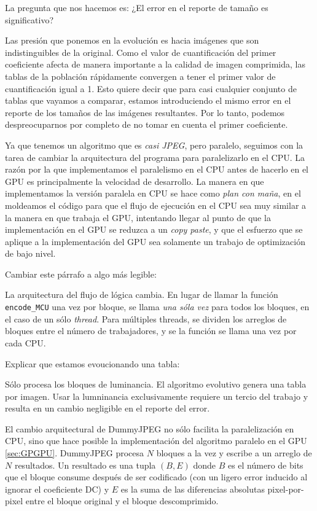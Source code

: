 La pregunta que nos hacemos es: ¿El error en el reporte de tamaño es significativo?

Las presión que ponemos en la evolución es hacia imágenes que son
indistinguibles de la original. Como el valor de cuantificación del primer
coeficiente afecta de manera importante a la calidad de imagen comprimida, las
tablas de la población rápidamente convergen a tener el primer valor de
cuantificación igual a 1. Esto quiere decir que para casi cualquier conjunto de
tablas que vayamos a comparar, estamos introduciendo el mismo error en el
reporte de los tamaños de las imágenes resultantes. Por lo tanto, podemos
despreocuparnos por completo de no tomar en cuenta el primer coeficiente.

Ya que tenemos un algoritmo que es \emph{casi JPEG}, pero paralelo, seguimos
con la tarea de cambiar la arquitectura del programa para paralelizarlo en el
CPU. La razón por la que implementamos el paralelismo en el CPU antes de
hacerlo en el GPU es principalmente la velocidad de desarrollo. La manera en
que implementamos la versión paralela en CPU se hace como \emph{plan con maña},
en el moldeamos el código para que el flujo de ejecución en el CPU sea muy
similar a la manera en que trabaja el GPU, intentando llegar al punto de que la
implementación en el GPU se reduzca a un \emph{copy paste}, y que el esfuerzo
que se aplique a la implementación del GPU sea solamente un trabajo de
optimización de bajo nivel.

Cambiar este párrafo a algo más legible:

    La arquitectura del flujo de lógica cambia. En lugar de llamar la
        función \verb+encode_MCU+ una vez por bloque, se llama \emph{una sóla
    vez} para todos los bloques, en el caso de un sólo \emph{thread}. Para
múltiples threads, se dividen los arreglos de bloques entre el número de
trabajadores, y se la función se llama una vez por cada CPU.

Explicar que estamos evoucionando una tabla:

    Sólo procesa los bloques de luminancia. El algoritmo evolutivo genera
        una tabla por imagen. Usar la lumninancia exclusivamente requiere un
    tercio del trabajo y resulta en un cambio negligible en el reporte del
error.

El cambio arquitectural de DummyJPEG no sólo facilita la paralelización en CPU,
sino que hace posible la implementación del algoritmo paralelo en el GPU \ref{sec:GPGPU}. DummyJPEG procesa $N$ bloques a la vez y escribe a un arreglo de $N$ resultados. Un resultado es una tupla $(B, E)$ donde $B$ es el número de bits que el bloque consume después de ser codificado (con un ligero error inducido al ignorar el coeficiente DC) y $E$ es la suma de las diferencias absolutas pixel-por-pixel entre el bloque original y el bloque descomprimido.

